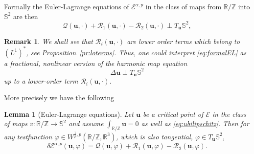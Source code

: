 \documentclass[a4paper,10pt,intlimits,ngerman]{amsart}
\newtheorem{lemma}[theorem]{Lemma}
\newtheorem{remark}[theorem]{Remark}
\numberwithin{equation}{section}
\newcommand{\R}{\mathbb{R}}
\newcommand{\Z}{\mathbb{Z}}
\renewcommand{\S}{\mathbb{S}}
\newcommand{\solu}{{\boldsymbol{u}}}
\newcommand{\lap}{\Delta }
\begin{document}
Formally the Euler-Lagrange equations of $\mathcal{E}^{\alpha,p}$ in the class of maps from $\R/\Z$ into $\S^2$ are then 
\begin{equation}\label{eq:formalEL}
 \mathcal{Q}(\solu,\cdot) + \mathcal{R}_1(\solu,\cdot) - \mathcal{R}_2(\solu,\cdot)\perp T_{\solu} \S^2,
\end{equation}

\begin{remark}
We shall see that $\mathcal{R}_i(\solu,\cdot)$ are lower order terms which belong to $(L^1)^\ast$, see Proposition~\ref{pr:loterms}.
Thus, one could interpret \eqref{eq:formalEL} as a fractional, nonlinear version of the harmonic map equation
\[
 \lap \solu \perp T_{\solu} \S^2
\]
up to a lower-order term $\mathcal{R}_i(\solu,\cdot)$.
\end{remark}

More precisely we have the following
\begin{lemma}[Euler-Lagrange equations]\label{la:EL}
Let $\solu$ be a critical point of $\mathcal{E}$ in the class of maps $v: \R/\Z \to \S^2$ and assume $\int_{\R/\Z} \solu = 0$ as well as \eqref{eq:ubilipschitz}. Then 
for any testfunction $\varphi \in W^{\frac{1}{p},p}(\R/\Z, \R^3)$, which is also tangential, $\varphi \in T_{\solu} \S^2$,
\[
 \delta \mathcal{E}^{\alpha,p}(\solu,\varphi) = \mathcal{Q}(\solu,\varphi) + \mathcal{R}_1(\solu,\varphi) - \mathcal{R}_2(\solu,\varphi).
\]
\end{lemma}
\end{document}
